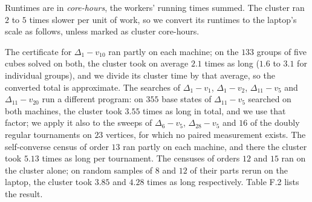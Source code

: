 \documentclass[
]{article}
\begin{document}
Runtimes are in \emph{core-hours}, the workers' running times summed.
The cluster ran \(2\) to \(5\) times slower per unit of work, so we
convert its runtimes to the laptop's scale as follows, unless marked as
cluster core-hours.

The certificate for \(\Delta_1 - v_{10}\) ran partly on each machine; on
the \(133\) groups of five cubes solved on both, the cluster took on
average \(2.1\) times as long (\(1.6\) to \(3.1\) for individual
groups), and we divide its cluster time by that average, so the
converted total is approximate. The searches of \(\Delta_1 - v_{1}\),
\(\Delta_1 - v_{2}\), \(\Delta_{11} - v_{5}\) and
\(\Delta_{11} - v_{20}\) run a different program: on \(355\) base states
of \(\Delta_{11} - v_{5}\) searched on both machines, the cluster took
\(3.55\) times as long in total, and we use that factor; we apply it
also to the sweeps of \(\Delta_6 - v_{5}\), \(\Delta_{28} - v_{5}\) and
\(16\) of the doubly regular tournaments on \(23\) vertices, for which
no paired measurement exists. The self-converse census of order \(13\)
ran partly on each machine, and there the cluster took \(5.13\) times as
long per tournament. The censuses of orders \(12\) and \(15\) ran on the
cluster alone; on random samples of \(8\) and \(12\) of their parts
rerun on the laptop, the cluster took \(3.85\) and \(4.28\) times as
long respectively. Table F.2 lists the result.
\end{document}
